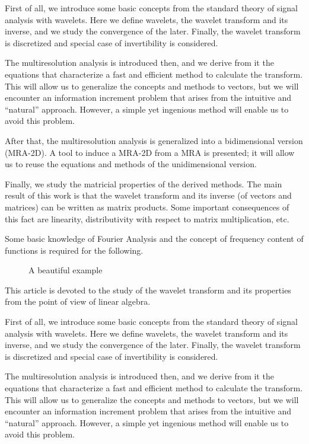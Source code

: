 \documentclass[letterpaper,10pt]{article}
\begin{document}
  First of all, we introduce some basic concepts from the standard theory of signal analysis with wavelets. Here we define wavelets, the wavelet transform and its inverse, and we study the convergence of the later. Finally, the wavelet transform is discretized and special case of invertibility is considered.
  
  The multiresolution analysis is introduced then, and we derive from it the equations that characterize a fast and efficient method to calculate the transform. This will allow us to generalize the concepts and methods to vectors, but we will encounter an information increment problem that arises from the intuitive and ``natural'' approach. However, a simple yet ingenious method will enable us to avoid this problem.
  
  After that, the multiresolution analysis is generalized into a bidimensional version (MRA-2D). A tool to induce a MRA-2D from a MRA is presented; it will allow us to reuse the equations and methods of the unidimensional version.
  
  Finally, we study the matricial properties of the derived methods. The main result of this work is that the wavelet transform and its inverse (of vectors and matrices) can be written as matrix products. Some important consequences of this fact are linearity, distributivity with respect to matrix multiplication, etc.
  
  Some basic knowledge of Fourier Analysis and the concept of frequency content of functions is required for the following.
  
  \begin{figure}[!ht]
    \centering
    \caption{A beautiful example}
  \end{figure}
  
  \noindent This article is devoted to the study of the wavelet transform and its properties from the point of view of linear algebra.
  
  First of all, we introduce some basic concepts from the standard theory of signal analysis with wavelets. Here we define wavelets, the wavelet transform and its inverse, and we study the convergence of the later. Finally, the wavelet transform is discretized and special case of invertibility is considered.
  
  The multiresolution analysis is introduced then, and we derive from it the equations that characterize a fast and efficient method to calculate the transform. This will allow us to generalize the concepts and methods to vectors, but we will encounter an information increment problem that arises from the intuitive and ``natural'' approach. However, a simple yet ingenious method will enable us to avoid this problem.
  
\end{document}
